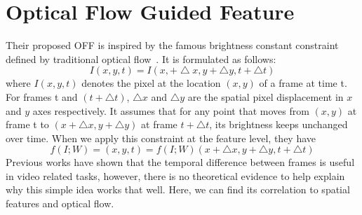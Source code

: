 \documentclass[10pt,twocolumn,letterpaper]{article}
\begin{document}
\section{Optical Flow Guided Feature}
Their proposed OFF is inspired by the famous brightness constant constraint defined by traditional optical flow~\cite{name16}. It is formulated as follows:
\begin{equation}
I(x,y,t)=I(x,+\bigtriangleup{x},y+\bigtriangleup y,t+\bigtriangleup t)
\end{equation}
where $I(x, y, t)$ denotes the pixel at the location $(x, y)$ of a frame at time t. For frames t and $(t + \bigtriangleup t)$, $\bigtriangleup x$ and $\bigtriangleup y$ are the spatial pixel displacement in $x$ and $y$ axes respectively. It assumes that for any point that moves from $(x, y)$ at frame t to $(x + \bigtriangleup x, y + \bigtriangleup y)$ at frame $t + \bigtriangleup t$, its brightness keeps unchanged over time. When we apply this constraint at the feature level, they have
\begin{equation}
f(I;W)=(x,y,t)=f(I;W)(x+\bigtriangleup x,y+\bigtriangleup y, t+ \bigtriangleup t)
\end{equation}
Previous works have shown that the temporal difference between frames is useful in video related tasks, however, there is no theoretical evidence to help explain why this simple idea works that well. Here, we can find its correlation to spatial features and optical flow.


\end{document}
